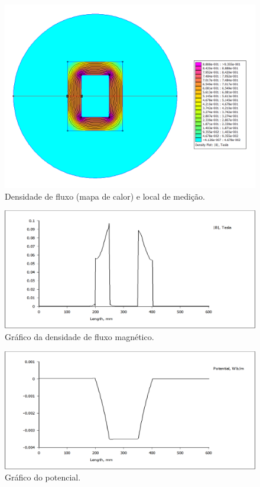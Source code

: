 \begin{figure}[H]
\centering
\includegraphics[scale=0.65]{img/femm2_4.png}
\caption[Densidade de fluxo (mapa de calor) e local de medição]{Densidade de fluxo (mapa de calor) e local de medição.}
\label{loc2_med}
\end{figure}

\begin{figure}[H]
\centering
\includegraphics[scale=0.3]{img/linha_B.png}
\caption[Gráfico da densidade de fluxo magnético]{Gráfico da densidade de fluxo magnético.}
\label{graf2_dfm}
\end{figure}

\begin{figure}[H]
\centering
\includegraphics[scale=0.3]{img/linha_pot.png}
\caption[Gráfico do potencial]{Gráfico do potencial.}
\label{graf2_pot}
\end{figure}

